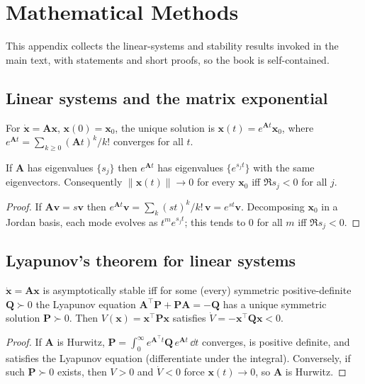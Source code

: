\chapter{Mathematical Methods}
\label{app:math}

This appendix collects the linear-systems and stability results invoked in the
main text, with statements and short proofs, so the book is self-contained.

\section{Linear systems and the matrix exponential}

For $\dot{\mathbf x}=\mathbf A\mathbf x$, $\mathbf x(0)=\mathbf x_0$, the unique
solution is $\mathbf x(t)=e^{\mathbf A t}\mathbf x_0$, where
$e^{\mathbf A t}=\sum_{k\ge0}(\mathbf A t)^k/k!$ converges for all $t$.

\begin{theorem}
If $\mathbf A$ has eigenvalues $\{s_j\}$ then $e^{\mathbf A t}$ has eigenvalues
$\{e^{s_j t}\}$ with the same eigenvectors. Consequently
$\|\mathbf x(t)\|\to0$ for every $\mathbf x_0$ iff $\Re s_j<0$ for all $j$.
\end{theorem}
\begin{proof}
If $\mathbf A\mathbf v=s\mathbf v$ then $e^{\mathbf A t}\mathbf v=\sum_k
(st)^k/k!\,\mathbf v=e^{st}\mathbf v$. Decomposing $\mathbf x_0$ in a Jordan basis,
each mode evolves as $t^m e^{s_j t}$; this tends to $0$ for all $m$ iff
$\Re s_j<0$.
\end{proof}

\section{Lyapunov's theorem for linear systems}

\begin{theorem}[Lyapunov]
\label{thm:lyap}
$\dot{\mathbf x}=\mathbf A\mathbf x$ is asymptotically stable iff for some (every)
symmetric positive-definite $\mathbf Q\succ0$ the Lyapunov equation
$\mathbf A^{\!\top}\mathbf P+\mathbf P\mathbf A=-\mathbf Q$ has a unique symmetric
solution $\mathbf P\succ0$. Then $V(\mathbf x)=\mathbf x^{\!\top}\mathbf P\mathbf x$
satisfies $\dot V=-\mathbf x^{\!\top}\mathbf Q\mathbf x<0$.
\end{theorem}
\begin{proof}
If $\mathbf A$ is Hurwitz, $\mathbf P=\int_0^{\infty}e^{\mathbf A^{\!\top}t}\mathbf
Q\,e^{\mathbf A t}\,\dd t$ converges, is positive definite, and satisfies the
Lyapunov equation (differentiate under the integral). Conversely, if such
$\mathbf P\succ0$ exists, then $V>0$ and $\dot V<0$ force $\mathbf x(t)\to0$, so
$\mathbf A$ is Hurwitz.
\end{proof}

